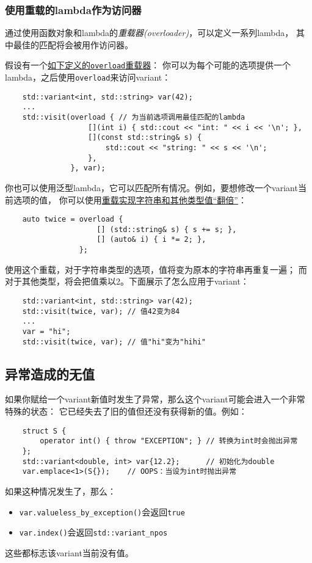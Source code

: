 \subsubsection{使用重载的lambda作为访问器}\label{ch16.3.3.4}
通过使用函数对象和lambda的\emph{重载器(overloader)}，可以定义一系列lambda，
其中最佳的匹配将会被用作访问器。

假设有一个\hyperref[ch14.1]{如下定义的\texttt{overload}重载器}：
你可以为每个可能的选项提供一个lambda，之后使用\texttt{overload}来访问variant：
\begin{lstlisting}
    std::variant<int, std::string> var(42);
    ...
    std::visit(overload { // 为当前选项调用最佳匹配的lambda
                   [](int i) { std::cout << "int: " << i << '\n'; },
                   [](const std::string& s) {
                       std::cout << "string: " << s << '\n';
                   },
               }, var);
\end{lstlisting}
你也可以使用泛型lambda，它可以匹配所有情况。例如，要想修改一个variant当前选项的值，
你可以使用\hyperref[重载的两倍lambda]{重载实现字符串和其他类型值“翻倍”}：
\begin{lstlisting}
    auto twice = overload {
                     [] (std::string& s) { s += s; },
                     [] (auto& i) { i *= 2; },
                 };
\end{lstlisting}
使用这个重载，对于字符串类型的选项，值将变为原本的字符串再重复一遍；
而对于其他类型，将会把值乘以2。下面展示了怎么应用于variant：
\begin{lstlisting}
    std::variant<int, std::string> var(42);
    std::visit(twice, var); // 值42变为84
    ...
    var = "hi";
    std::visit(twice, var); // 值"hi"变为"hihi"
\end{lstlisting}

\subsection{异常造成的无值}\label{ch16.3.4}
如果你赋给一个variant新值时发生了异常，那么这个variant可能会进入一个非常特殊的状态：
它已经失去了旧的值但还没有获得新的值。例如：
\begin{lstlisting}
    struct S {
        operator int() { throw "EXCEPTION"; } // 转换为int时会抛出异常
    };
    std::variant<double, int> var{12.2};      // 初始化为double
    var.emplace<1>(S{});    // OOPS：当设为int时抛出异常
\end{lstlisting}
如果这种情况发生了，那么：
\begin{itemize}
    \item \texttt{var.valueless\_by\_exception()}会返回\texttt{true}
    \item \texttt{var.index()}会返回\texttt{std::variant\_npos}
\end{itemize}
这些都标志该variant当前没有值。

